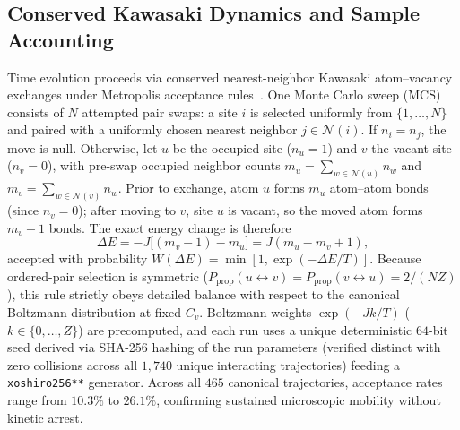 \documentclass[aps,pre,reprint,superscriptaddress,amsmath,amssymb,floatfix]{revtex4-2}
\begin{document}
\subsection{Conserved Kawasaki Dynamics and Sample Accounting}
\label{sec:dynamics}

Time evolution proceeds via conserved nearest-neighbor Kawasaki atom--vacancy exchanges under Metropolis acceptance rules~\cite{Metropolis1953,Kawasaki1966,Kawasaki1972}. One Monte Carlo sweep (MCS) consists of $N$ attempted pair swaps: a site $i$ is selected uniformly from $\{1,\dots,N\}$ and paired with a uniformly chosen nearest neighbor $j \in \mathcal{N}(i)$. If $n_i = n_j$, the move is null. Otherwise, let $u$ be the occupied site ($n_u = 1$) and $v$ the vacant site ($n_v = 0$), with pre-swap occupied neighbor counts $m_u = \sum_{w \in \mathcal{N}(u)} n_w$ and $m_v = \sum_{w \in \mathcal{N}(v)} n_w$. Prior to exchange, atom $u$ forms $m_u$ atom--atom bonds (since $n_v = 0$); after moving to $v$, site $u$ is vacant, so the moved atom forms $m_v - 1$ bonds. The exact energy change is therefore
\begin{equation}
  \Delta E = -J\bigl[(m_v - 1) - m_u\bigr] = J(m_u - m_v + 1),
  \label{eq:delta_e}
\end{equation}
accepted with probability $W(\Delta E) = \min\!\left[1, \exp(-\Delta E / T)\right]$. Because ordered-pair selection is symmetric ($P_{\mathrm{prop}}(u \leftrightarrow v) = P_{\mathrm{prop}}(v \leftrightarrow u) = 2/(NZ)$), this rule strictly obeys detailed balance with respect to the canonical Boltzmann distribution at fixed $C_v$. Boltzmann weights $\exp(-Jk/T)$ ($k \in \{0,\dots,Z\}$) are precomputed, and each run uses a unique deterministic $64$-bit seed derived via SHA-256 hashing of the run parameters (verified distinct with zero collisions across all $1{,}740$ unique interacting trajectories) feeding a \texttt{xoshiro256**} generator. Across all $465$ canonical trajectories, acceptance rates range from $10.3\%$ to $26.1\%$, confirming sustained microscopic mobility without kinetic arrest.
\end{document}
